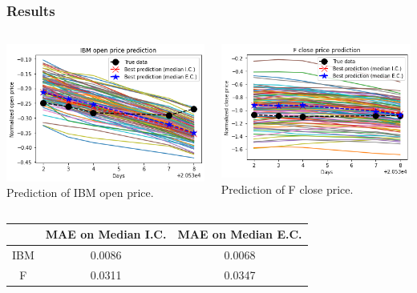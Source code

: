 \documentclass{beamer}
\begin{document}
{\begin{frame}
\end{frame}
\begin{frame}
	\frametitle{Results}
	\begin{columns}
	\begin{column}{.5\textwidth}
	\centering
	\includegraphics[height=0.45\textheight]{open_IBM.png}
	Prediction of IBM open price.
	\end{column}%

	\begin{column}{.5\textwidth}
	\centering
	\includegraphics[height=0.45\textheight]{close_F.png}
	Prediction of F close price.
	\end{column}
	\end{columns}

	\hfill \break

	\centering
	\begin{tabular}{|c|c|c|} \hline
	& MAE on Median I.C. & MAE on Median E.C. \\
	\hline
	IBM & 0.0086 & 0.0068 \\
	\hline
	F & 0.0311 & 0.0347 \\
	\hline
 	\end{tabular}


\end{frame}}
\end{document}
